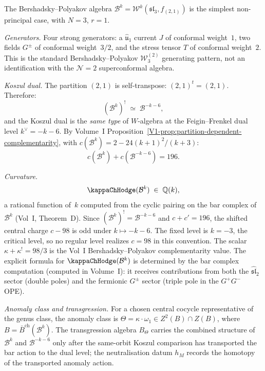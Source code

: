 \begin{computation}
\label{comp:bp-anomaly-completion}
The Bershadsky--Polyakov algebra
$\mathcal B^k=\mathcal W^k(\mathfrak{sl}_3,f_{(2,1)})$
is the simplest non-principal case, with $N=3$, $r=1$.

\emph{Generators.}
Four strong generators: a $\widehat{\mathfrak u}_1$ current \(J\)
of conformal weight~\(1\), two fields \(G^\pm\) of conformal
weight~\(3/2\), and the stress tensor \(T\) of conformal weight~\(2\).
This is the standard Bershadsky--Polyakov
\(\mathcal W^{(2)}_3\) generating pattern, not an identification
with the \(\mathcal N=2\) superconformal algebra.

\emph{Koszul dual.}
The partition $(2,1)$ is self-transpose:
$(2,1)^t=(2,1)$. Therefore:
\[
(\mathcal B^k)^!
\;\simeq\;
\mathcal B^{-k-6},
\]
and the Koszul dual is the \emph{same type} of $W$-algebra
at the Feigin--Frenkel dual level $k^\vee=-k-6$.
By Volume~I
Proposition~\ref*{V1-prop:partition-dependent-complementarity},
with \(c(\mathcal{B}^k)=2-24(k+1)^2/(k+3)\):
\[
c(\mathcal B^k)+c(\mathcal B^{-k-6})=196.
\]

\emph{Curvature.}
\[
\kappaChHodge(\mathcal B^k)
\;\in\;\mathbb Q(k),
\]
a rational function of~$k$ computed from the cyclic pairing
on the bar complex of $\mathcal B^k$ (Vol~I, Theorem~D).
Since $(\mathcal B^k)^!=\mathcal B^{-k-6}$ and
$c+c'=196$, the shifted central charge \(c-98\) is odd under
\(k\mapsto -k-6\).  The fixed level is \(k=-3\), the critical
level, so no regular level realizes \(c=98\) in this convention.
The scalar \(\kappa+\kappa^!=98/3\) is the Vol~I
Bershadsky--Polyakov complementarity value.
The explicit formula for $\kappaChHodge(\mathcal B^k)$ is determined
by the bar complex computation
\textup{(}computed in Volume~I\textup{)}:
it receives contributions from both the
$\widehat{\mathfrak{sl}}_2$ sector (double poles) and the
fermionic $G^\pm$ sector (triple pole in the $G^+G^-$ OPE).

\emph{Anomaly class and transgression.}
For a chosen central cocycle representative of the genus class, the
anomaly class is
\(\Theta=\kappa\cdot\omega_1\in Z^2(B)\cap Z(B)\),
where $B=\bar B^{\mathrm{ch}}(\mathcal B^k)$. The
transgression algebra $B_\Theta$ carries the combined
structure of $\mathcal B^k$ and $\mathcal B^{-k-6}$ only after the
same-orbit Koszul comparison has transported the bar action to the
dual level; the neutralisation datum \(h_M\) records the homotopy
of the transported anomaly action.


\end{computation}
